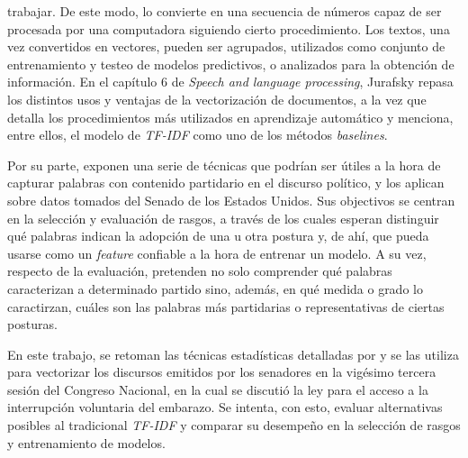 trabajar.
De este modo, lo convierte en una secuencia de números capaz de ser
procesada por una computadora siguiendo cierto procedimiento.
Los textos, una vez convertidos en vectores, pueden ser agrupados, utilizados
como conjunto de entrenamiento y testeo de modelos predictivos, o analizados para
la obtención de información.
En el capítulo 6 de \textit{Speech and language processing}, Jurafsky
repasa los distintos usos y ventajas de la vectorización de documentos, a la vez
que detalla los procedimientos más utilizados en aprendizaje automático y menciona,
entre ellos, el modelo de \textit{TF-IDF} como uno de los métodos \textit{baselines}.
\par
Por su parte, \cite{monroe2008fightin} exponen una serie de técnicas
que podrían ser útiles a la hora de capturar palabras con contenido partidario
en el discurso político, y los aplican sobre datos tomados del Senado de los Estados
Unidos. Sus objectivos se centran en la selección y evaluación de rasgos, a través
de los cuales esperan distinguir qué palabras indican la adopción de una u otra postura
y, de ahí, que pueda usarse como un \textit{feature} confiable a la hora de entrenar un
modelo. A su vez, respecto de la evaluación, pretenden no solo comprender qué
palabras caracterizan a determinado partido sino, además, en qué medida o grado
lo caractirzan, cuáles son las palabras más partidarias o representativas de ciertas
posturas.
\par
En este trabajo, se retoman las técnicas estadísticas detalladas por
\citeauthor{monroe2008fightin} y se las utiliza para vectorizar los
discursos emitidos por los senadores en la vigésimo tercera sesión
del Congreso Nacional, en la cual se discutió la ley para el acceso a la interrupción
voluntaria del embarazo.
Se intenta, con esto, evaluar alternativas posibles al tradicional \textit{TF-IDF}
y comparar su desempeño en la selección de rasgos y entrenamiento de modelos.
